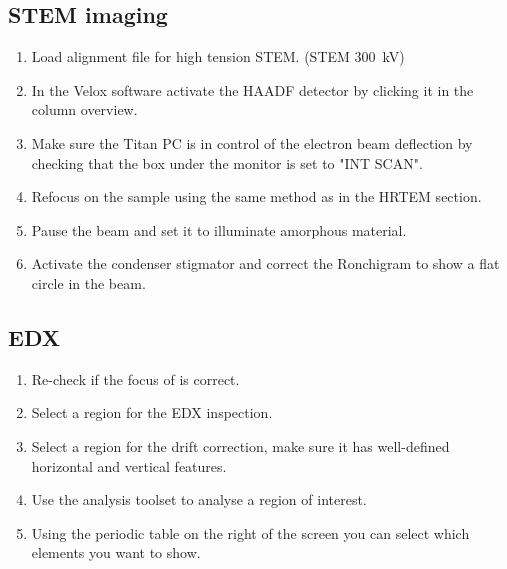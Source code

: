 \documentclass[a4paper]{scrartcl}
\begin{document}
\subsection*{STEM imaging}
\begin{enumerate}
    \item Load alignment file for high tension STEM. (STEM \SI{300}{\kilo \volt})
    \item In the Velox software activate the HAADF detector by clicking it in the column overview.
    \item Make sure the Titan PC is in control of the electron beam deflection by checking that the box under the monitor is set to "INT SCAN".
    \item Refocus on the sample using the same method as in the HRTEM section.
    \item Pause the beam and set it to illuminate amorphous material.
    \item Activate the condenser stigmator and correct the Ronchigram to show a flat circle in the beam.
\end{enumerate}

\subsection*{EDX}
\begin{enumerate}
    \item Re-check if the focus of is correct.
    \item Select a region for the EDX inspection.
    \item Select a region for the drift correction, make sure it has well-defined horizontal and vertical features.
    \item Use the analysis toolset to analyse a region of interest.
    \item Using the periodic table on the right of the screen you can select which elements you want to show.
\end{enumerate}
\end{document}
